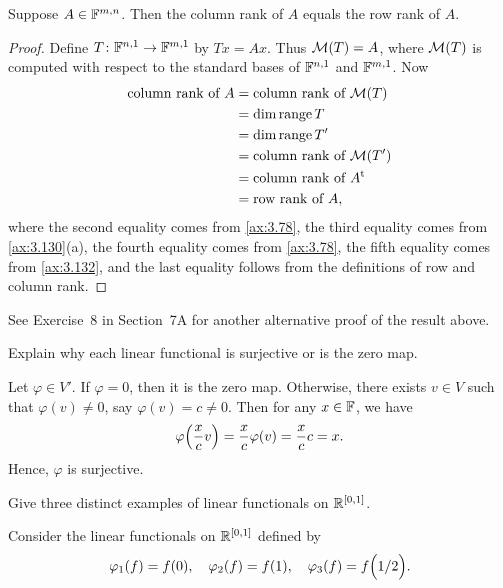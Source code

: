 \begin{result}\label{ax:3.133}
Suppose $A\in\mathbb{F}^{m,n}$. Then the column rank of $A$ equals the row rank of $A$.
\end{result}

\begin{proof}
Define $T\colon\mathbb{F}^{n,1}\to\mathbb{F}^{m,1}$ by $Tx=Ax$. Thus $\mathcal{M}(T)=A$, where
$\mathcal{M}(T)$ is computed with respect to the standard bases of $\mathbb{F}^{n,1}$ and
$\mathbb{F}^{m,1}$. Now
\begin{align*}
\text{column rank of } A &= \text{column rank of } \mathcal{M}(T)\\
  &= \operatorname{dim}\operatorname{range} T\\
  &= \operatorname{dim}\operatorname{range} T'\\
  &= \text{column rank of } \mathcal{M}(T')\\
  &= \text{column rank of } A^{\mathrm{t}}\\
  &= \text{row rank of } A,
\end{align*}
where the second equality comes from \ref{ax:3.78}, the third equality comes
from \ref{ax:3.130}(a), the fourth equality comes from \ref{ax:3.78}, the fifth
equality comes from \ref{ax:3.132}, and the last equality follows from the
definitions of row and column rank.
\end{proof}

See Exercise~8 in Section~7A for another alternative proof of the result above.


\begin{exercise}
Explain why each linear functional is surjective or is the zero map.
\end{exercise}
\begin{solution}

Let $\varphi\in V'$. If $\varphi=0$, then it is the zero map. Otherwise, there
exists $v\in V$ such that $\varphi(v)\ne0$, say $\varphi(v)=c\ne0$. Then for any
$x\in\mathbb{F}$, we have
\[ \varphi\Bigl(\frac{x}{c}v\Bigr) = \frac{x}{c}\varphi(v) = \frac{x}{c}c = x. \]
Hence, $\varphi$ is surjective.
\end{solution}

\begin{exercise}
Give three distinct examples of linear functionals on $\mathbb{R}^{[0,1]}$.
\end{exercise}
\begin{solution}
Consider the linear functionals on $\mathbb{R}^{[0,1]}$ defined by
\[ \varphi_1(f)=f(0), \quad \varphi_2(f)=f(1), \quad
   \varphi_3(f)=f\Bigl(1/2\Bigr). \qedhere \]
\end{solution}

